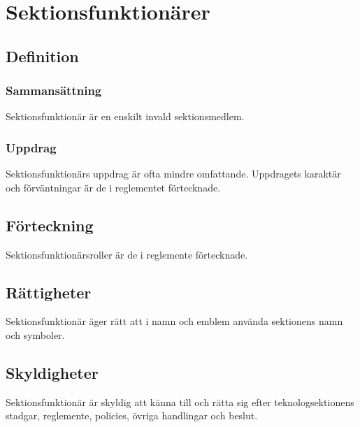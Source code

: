 \section{Sektionsfunktionärer}
\subsection{Definition}
\subsubsection{Sammansättning}
Sektionsfunktionär är en enskilt invald sektionsmedlem.
\subsubsection{Uppdrag}
Sektionsfunktionärs uppdrag är ofta mindre omfattande. Uppdragets karaktär och förväntningar är de i reglementet förtecknade.

\subsection{Förteckning}
Sektionsfunktionärsroller är de i reglemente förtecknade.

\subsection{Rättigheter}
Sektionsfunktionär äger rätt att i namn och emblem använda sektionens namn och symboler.

\subsection{Skyldigheter}
Sektionsfunktionär är skyldig att känna till och rätta sig efter teknologsektionens stadgar, reglemente, policies, övriga handlingar och beslut.
